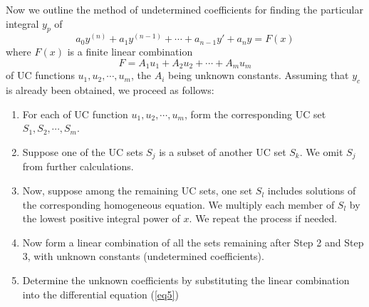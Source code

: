 \vspace{10pt}
\begin{note}{}
    Now we outline the method of undetermined coefficients for finding the particular integral $y_p$ of
    \begin{equation} \tag{3.3.1}
        a_0y^{(n)} + a_1y^{(n-1)} + \cdots + a_{n-1}y' + a_ny = F(x)
    \end{equation}
    where $F(x)$ is a finite linear combination \[
        F = A_1u_1 + A_2u_2 + \cdots + A_mu_m
    \] of UC functions $u_1, u_2, \cdots, u_m$, the $A_i$ being unknown constants. Assuming that $y_c$ is already been obtained, we proceed as follows:
    \begin{enumerate}
        \item For each of UC function $u_1, u_2, \cdots, u_m$, form the corresponding UC set $S_1, S_2, \cdots, S_m$.
        \item Suppose one of the UC sets $S_j$ is a subset of another UC set $S_k$. We omit $S_j$ from further calculations.
        \item Now, suppose among the remaining UC sets, one set $S_l$ includes solutions of the corresponding homogeneous equation. We multiply each member of $S_l$ by the lowest positive integral power of $x$. We repeat the process if needed.
        \item Now form a linear combination of all the sets remaining after Step 2 and Step 3, with unknown constants (undetermined coefficients).
        \item Determine the unknown coefficients by substituting the linear combination into the differential equation (\ref{eq5})
    \end{enumerate}
\end{note}

